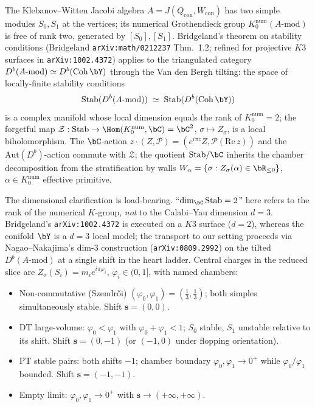 \begin{remark}
\label{rem:wave5-bridgeland-stab}
The Klebanov--Witten Jacobi algebra $A = J(Q_{\mathrm{con}},
W_{\mathrm{con}})$ has two simple modules $S_0, S_1$ at the vertices;
its numerical Grothendieck group $K_0^{\mathrm{num}}(A\text{-mod})$ is
free of rank two, generated by $[S_0], [S_1]$. Bridgeland's theorem on
stability conditions (Bridgeland \texttt{arXiv:math/0212237} Thm.~1.2;
refined for projective $K3$ surfaces in \texttt{arXiv:1002.4372})
applies to the triangulated category $D^b(A\text{-mod}) \simeq
D^b(\mathrm{Coh}\,\bY)$ through the Van den Bergh tilting: the space
of locally-finite stability conditions
\[
  \mathrm{Stab}(D^b(A\text{-mod})) \;\simeq\;
  \mathrm{Stab}(D^b(\mathrm{Coh}\,\bY))
\]
is a complex manifold whose local dimension equals the rank of
$K_0^{\mathrm{num}} = 2$; the forgetful map
$\mathcal{Z} : \mathrm{Stab} \to \Hom(K_0^{\mathrm{num}}, \bC) = \bC^2$,
$\sigma \mapsto Z_\sigma$, is a local biholomorphism. The $\bC$-action
$z \cdot (Z, \mathcal{P}) = (e^{i\pi z} Z, \mathcal{P}(\mathrm{Re}\, z))$
and the $\mathrm{Aut}(D^b)$-action commute with $\mathcal{Z}$; the
quotient $\mathrm{Stab}/\bC$ inherits the chamber decomposition from
the stratification by walls $W_\alpha = \{\sigma : Z_\sigma(\alpha) \in
\bR_{\leq 0}\}$, $\alpha \in K_0^{\mathrm{num}}$ effective primitive.

The dimensional clarification is load-bearing. ``$\dim_\bC \mathrm{Stab}
= 2$'' here refers to the rank of the numerical $K$-group, \emph{not}
to the Calabi--Yau dimension $d = 3$. Bridgeland's
\texttt{arXiv:1002.4372} is executed on a $K3$ surface ($d = 2$),
whereas the conifold $\bY$ is a $d = 3$ local model; the transport
to our setting proceeds via Nagao--Nakajima's dim-$3$ construction
(\texttt{arXiv:0809.2992}) on the tilted $D^b(A\text{-mod})$ at a
single shift in the heart ladder. Central charges in the reduced slice
are $Z_\sigma(S_i) = m_i e^{i\pi \varphi_i}$, $\varphi_i \in (0, 1]$,
with named chambers:
\begin{itemize}[leftmargin=2em]
\item Non-commutative (Szendrői) $(\varphi_0, \varphi_1) =
  (\tfrac{1}{3}, \tfrac{1}{3})$; both simples simultaneously stable.
  Shift $\mathbf{s} = (0, 0)$.
\item DT large-volume: $\varphi_0 < \varphi_1$ with $\varphi_0 +
  \varphi_1 < 1$; $S_0$ stable, $S_1$ unstable relative to its shift.
  Shift $\mathbf{s} = (0, -1)$ (or $(-1, 0)$ under flopping orientation).
\item PT stable pairs: both shifts $-1$; chamber boundary $\varphi_0,
  \varphi_1 \to 0^+$ while $\varphi_0 / \varphi_1$ bounded. Shift
  $\mathbf{s} = (-1, -1)$.
\item Empty limit: $\varphi_0, \varphi_1 \to 0^+$ with $\mathbf{s}
  \to (+\infty, +\infty)$.
\end{itemize}
\end{remark}

